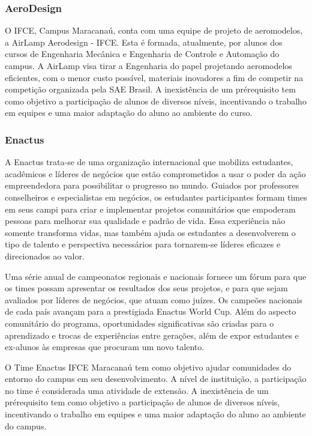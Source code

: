 \subsubsection{AeroDesign}

O IFCE, Campus Maracanaú, conta com uma equipe de projeto de aeromodelos, a AirLamp Aerodesign - IFCE. Esta é formada, atualmente, por alunos dos cursos de Engenharia Mecânica e Engenharia de Controle e Automação do campus. A AirLamp visa tirar a Engenharia do papel projetando aeromodelos eficientes, com o menor custo possível, materiais inovadores a fim de competir na competição organizada pela SAE Brasil. A inexistência de um prérequisito tem como objetivo a participação de alunos de diversos níveis, incentivando o trabalho em equipes e uma maior adaptação do aluno ao ambiente do curso.

\subsubsection{Enactus}

A Enactus trata-se de uma organização internacional que mobiliza estudantes, acadêmicos e líderes de negócios que estão comprometidos a usar o poder da ação empreendedora para possibilitar o progresso no mundo. Guiados por professores conselheiros e especialistas em negócios, os estudantes
participantes formam times em seus campi para criar e implementar projetos comunitários que empoderam pessoas para melhorar sua qualidade e padrão de vida. Essa experiência não somente transforma vidas, mas também ajuda os estudantes a desenvolverem o tipo de talento e perspectiva necessários para tornarem-se líderes eficazes e direcionados ao valor.

Uma série anual de campeonatos regionais e nacionais fornece um fórum para que os times possam apresentar os resultados dos seus projetos, e para que sejam avaliados por líderes de negócios, que atuam como juízes. Os campeões nacionais de cada país avançam para a prestigiada Enactus World Cup. Além do aspecto comunitário do programa, oportunidades significativas são criadas para o aprendizado e trocas de experiências entre gerações, além de expor estudantes e ex-alunos às empresas que procuram um novo talento.

O Time Enactus IFCE Maracanaú tem como objetivo ajudar comunidades do entorno do campus em seu desenvolvimento. A nível de instituição, a participação no time é considerada uma atividade de extensão. A inexistência de um prérequisito tem como objetivo a participação de alunos de diversos níveis, incentivando o trabalho em equipes e uma maior adaptação do aluno ao ambiente do campus.



